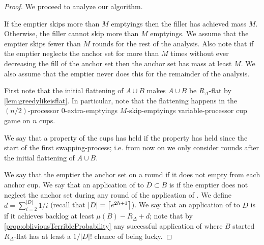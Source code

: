 \begin{proof}
We proceed to analyze our algorithm.

If the emptier skips more than $M$ emptyings then the filler has
achieved mass $M$. Otherwise, the filler cannot skip more than
$M$ emptyings. We assume that the emptier skips fewer than $M$
rounds for the rest of the analysis.
Also note that if the emptier neglects the anchor set for more
than $M$ times without ever decreasing the fill of the anchor set
then the anchor set has mass at least $M$. We also assume that
the emptier never does this for the remainder of the analysis.

First note that the initial flattening of $A\cup B$ makes $A\cup
B$ be $R_\Delta$-flat by \cref{lem:greedylikeisflat}. In
particular, note that the flattening happens in the
$(n/2)$-processor $0$-extra-emptyings $M$-skip-emptyings
variable-processor cup game on $n$ cups.

We say that a property of the cups has  held if the
property has held since the start of the first swapping-process;
i.e. from now on we only consider rounds after the initial
flattening of $A\cup B$.

We say that the emptier  the anchor set on a round
if it does not empty from each anchor cup. We say that an
application of \randalg to $D\subset B$ is  if
the emptier does not neglect the anchor set during any round of
the application of \randalg. We define $d = \sum_{i=2}^{|D|} 1/i$ (recall
that $|D| = \left\lceil e^{2h+1} \right\rceil$). We say that an application of
\randalg to $D$ is  if it achieves backlog at
least $\mu(B) - R_\Delta + d$; note that by 
\cref{prop:obliviousTerribleProbability} any successful
application of \randalg where $B$ started $R_\Delta$-flat has
at least a $1/|D|!$ chance of being lucky. 


\end{proof}
